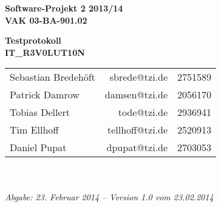 \documentclass[fontsize=12pt,paper=a4,twoside]{scrartcl}
\begin{document}
\thispagestyle{fancy} \fancyhead[LO,RE]{ }  \fancyfoot[C]{}

\vspace{3cm} 
\begin{minipage}
	[H]{ 
	\textwidth} 
	\begin{center}
		\bf \Large Software-Projekt 2 2013/14\\
		\smallskip \small VAK 03-BA-901.02\\
		\vspace{3cm} 
	\end{center}
\end{minipage}
\begin{minipage}
	[H]{ 
	\textwidth} 
	\begin{center}
		\vspace{1cm} \bf \Large Testprotokoll\\
		\vspace{3ex} \small IT\_R3V0LUT10N\\
		\vfill 
	\end{center}
\end{minipage}
\vfill 
\begin{minipage}
	[H]{ 
	\textwidth} 
	\begin{center}
		\sf 
		\begin{tabular}
			{lrr} Sebastian Bredehöft & sbrede@tzi.de & 2751589\\
			Patrick Damrow & damsen@tzi.de & 2056170\\
			Tobias Dellert & tode@tzi.de & 2936941\\
			Tim Ellhoff & tellhoff@tzi.de & 2520913\\
			Daniel Pupat & dpupat@tzi.de & 2703053\\
		\end{tabular}
		\\
		~ \vspace{2cm} \\
		\it Abgabe: 23. Februar 2014 -- Version 1.0 vom 23.02.2014 \\
		~ 
	\end{center}
\end{minipage}

\newpage

\thispagestyle{fancy} \fancyhead{}   \fancyfoot{} 
\renewcommand{\headrulewidth}{0.4pt} 
\tableofcontents
\newpage
\end{document}
